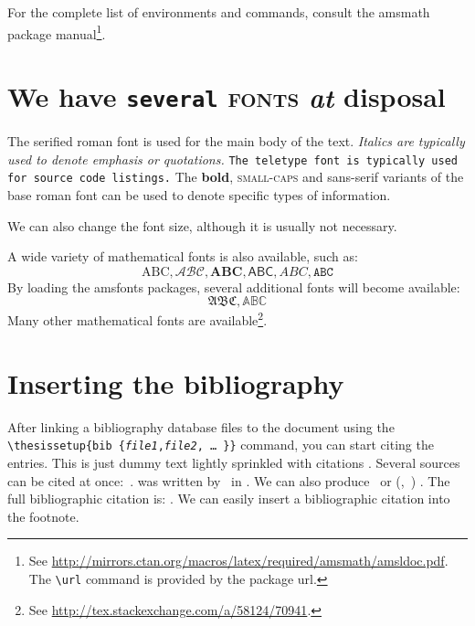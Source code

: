 \documentclass[
  digital,     %
  oneside,     %
  nosansbold,  %
  nocolorbold, %
  lof,         %
  lot,         %
]{fithesis4}
\begin{document}
For the complete list of environments and commands, consult the
\textsf{amsmath} package manual\footnote{
  See \url{http://mirrors.ctan.org/macros/latex/required/amsmath/amsldoc.pdf}.
  The \texttt{\textbackslash url} command is provided by the
  package \textsf{url}.
}.

\chapter{\textnormal{We \textsf{have} \texttt{several} \textsc{fonts}
  \textit{at} \textbf{disposal}}}
The serified roman font is used for the main body of the text.
\textit{Italics are typically used to denote emphasis or
quotations.} \texttt{The teletype font is typically used for source
code listings.} The \textbf{bold}, \textsc{small-caps} and
\textsf{sans-serif} variants of the base roman font can be used to
denote specific types of information.

\tiny We \scriptsize can \footnotesize also \small change \normalsize
the \large font \Large size, \LARGE although \huge it \Huge
is \huge usually \LARGE not \Large necessary.\normalsize

A wide variety of mathematical fonts is also available, such as: \[
  \mathrm{ABC}, \mathcal{ABC}, \mathbf{ABC}, \mathsf{ABC},
  \mathit{ABC}, \mathtt{ABC}
\] By loading the \textsf{amsfonts} packages, several additional
fonts will become available: \[
  \mathfrak{ABC}, \mathbb{ABC}
\] Many other mathematical fonts are available\footnote{
  See \url{http://tex.stackexchange.com/a/58124/70941}.
}.

\chapter{Inserting the bibliography}
After linking a bibliography data\-base files to the document using
the \verb"\"\texttt{thesis\discretionary{-}{}{}setup\{bib\discretionary{=}{=}{=}%
\{\textit{file1},\textit{file2},\,\ldots\,\}\}} command, you can
start citing the entries. This is just dummy text
\parencite{borgman03} lightly sprinkled with citations
\parencite[p.~123]{greenberg98}. Several sources can be cited at
once:~\cite{borgman03,greenberg98,thanh01}.
 was written by~\citeauthor{greenberg98} in
\citeyear{greenberg98}. We can also produce \textcite{greenberg98}%
\ or %
\def\citeauthoryear#1{(\textcite{#1},~\citeyear{#1})}%
\citeauthoryear{greenberg98}%
. The full bibliographic citation is:
\emph{}. We can easily insert a bibliographic
citation into the footnote.
\end{document}
